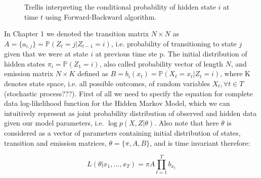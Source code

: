 \begin{figure}[htbp]
\begin{center}
\end{center}
\caption{Trellis interpreting the conditional probability of hidden state $i$ at time $t$ using Forward-Backward algorithm.}
\end{figure}

In Chapter 1 we denoted the transition matrix $N{\times}N$ as $A=\{a_{i,j}\}=\mathbb{P}(Z_{t}=j|Z_{t-1}=i)$, i.e. probability of transitioning to state $j$ given that we were at state $i$ at previous time ste  p. The initial distribution of hidden states $\pi_i = \mathbb{P}(Z_1=i)$, also called probability vector of length $N$, and emission matrix $N{\times}K$ defined as $B=b_i(x_t) = \mathbb{P}(X_t=x_t|Z_t=i)$, where K denotes state space, i.e. all possible outcomes, of random variables $X_t, \forall t \in T$(stochastic process???). First of all we need to specify the equation for complete data log-likelihood function for the Hidden Markov Model, which we can intuitively represent as joint probability distribution of observed and hidden data given our model parameters, i.e. $\log p(X,Z|\theta)$. Also note that here $\theta$ is considered as a vector of parameters containing initial distribution of states, transition and emission matrices, $\theta = \{\pi, A,B\}$, and is time invariant therefore:

\begin{equation}
L(\theta|x_1,...,x_T) = \pi A \prod_{t=1}^{T} b_{x_t}
\end{equation}

